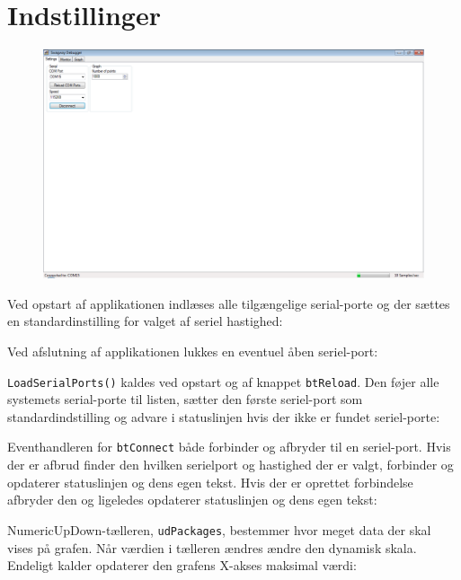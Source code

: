 \documentclass[a4paper,oneside,article,danish,table]{memoir}
\newcommand{\form}[2]{}
\begin{document}
\section{Indstillinger}
\begin{figure}[htbp]
  \centering
  \includegraphics[width=1\textwidth]{settings.png}
\end{figure}
Ved opstart af applikationen indlæses alle tilgængelige serial-porte og der sættes en standardinstilling for valget af seriel hastighed:
\form{34}{39}
Ved afslutning af applikationen lukkes en eventuel åben seriel-port:
\form{41}{48}

\texttt{LoadSerialPorts()} kaldes ved opstart og af knappet \texttt{btReload}. Den føjer alle systemets serial-porte til listen, sætter den første seriel-port som standardindstilling og advare i statuslinjen hvis der ikke er fundet seriel-porte:
\form{50}{68}

Eventhandleren for \texttt{btConnect} både forbinder og afbryder til en seriel-port. Hvis der er afbrud finder den hvilken serielport og hastighed der er valgt, forbinder og opdaterer statuslinjen og dens egen tekst. Hvis der er oprettet forbindelse afbryder den og ligeledes opdaterer statuslinjen og dens egen tekst:
\form{76}{104}
NumericUpDown-tælleren, \texttt{udPackages}, bestemmer hvor meget data der skal vises på grafen. Når værdien i tælleren ændres ændre den dynamisk skala. Endeligt kalder opdaterer den grafens X-akses maksimal værdi:
\form{106}{125}
\end{document}
